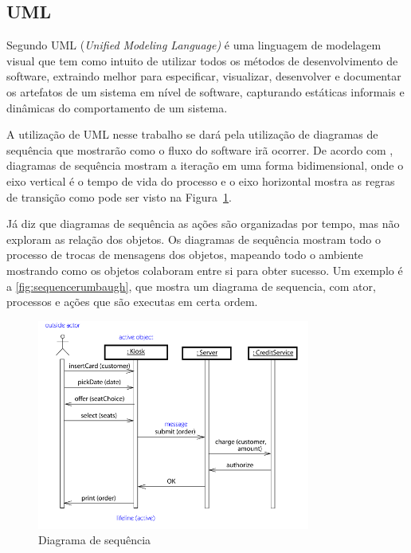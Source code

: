 \subsection{UML}

Segundo  UML (\textit{Unified Modeling Language)} é uma linguagem de modelagem visual que tem como intuito de utilizar todos os métodos de desenvolvimento de software, extraindo melhor para especificar, visualizar, desenvolver e documentar os artefatos de um sistema em nível de software, capturando estáticas informais e dinâmicas do comportamento de um sistema.


A utilização de UML nesse trabalho se dará pela utilização de diagramas de sequência que mostrarão como o fluxo do software irã ocorrer. De acordo com , diagramas de sequência mostram a iteração em uma forma bidimensional, onde o eixo vertical é o tempo de vida do processo e o eixo horizontal mostra as regras de transição como pode ser visto na Figura~\ref{fig:sequencerumbaugh}. %


Já  diz que diagramas de sequência as ações são organizadas por tempo, mas não exploram as relação dos objetos. Os diagramas de sequência mostram todo o processo de trocas de mensagens dos objetos, mapeando todo o ambiente mostrando como os objetos colaboram entre si para obter sucesso. Um exemplo é a \autoref{fig:sequencerumbaugh}, que mostra um diagrama de sequencia, com ator, processos e ações que são executas em certa ordem. 
 \begin{figure}[H]
	\centering
    	\caption{\label{fig:sequencerumbaugh} Diagrama de sequência }
		\includegraphics[width = 0.8\textwidth]	{resources/sequencediagramrumbaugh}
\end{figure}




